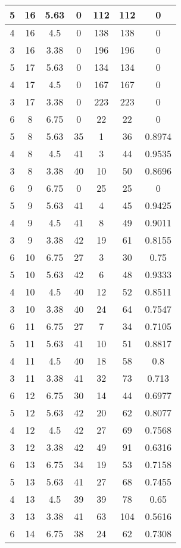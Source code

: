 \documentclass[letterpaper, 12pt]{article}
\begin{document}
\begin{longtable}{|c|c|c|c|c|c|c|}
\hline
5 & 16 & 5.63 & 0 & 112 & 112 & 0 \\
\hline
4 & 16 & 4.5 & 0 & 138 & 138 & 0 \\
\hline
3 & 16 & 3.38 & 0 & 196 & 196 & 0 \\
\hline
5 & 17 & 5.63 & 0 & 134 & 134 & 0 \\
\hline
4 & 17 & 4.5 & 0 & 167 & 167 & 0 \\
\hline
3 & 17 & 3.38 & 0 & 223 & 223 & 0 \\
\hline
6 & 8 & 6.75 & 0 & 22 & 22 & 0 \\
\hline
5 & 8 & 5.63 & 35 & 1 & 36 & 0.8974 \\
\hline
4 & 8 & 4.5 & 41 & 3 & 44 & 0.9535 \\
\hline
3 & 8 & 3.38 & 40 & 10 & 50 & 0.8696 \\
\hline
6 & 9 & 6.75 & 0 & 25 & 25 & 0 \\
\hline
5 & 9 & 5.63 & 41 & 4 & 45 & 0.9425 \\
\hline
4 & 9 & 4.5 & 41 & 8 & 49 & 0.9011 \\
\hline
3 & 9 & 3.38 & 42 & 19 & 61 & 0.8155 \\
\hline
6 & 10 & 6.75 & 27 & 3 & 30 & 0.75 \\
\hline
5 & 10 & 5.63 & 42 & 6 & 48 & 0.9333 \\
\hline
4 & 10 & 4.5 & 40 & 12 & 52 & 0.8511 \\
\hline
3 & 10 & 3.38 & 40 & 24 & 64 & 0.7547 \\
\hline
6 & 11 & 6.75 & 27 & 7 & 34 & 0.7105 \\
\hline
5 & 11 & 5.63 & 41 & 10 & 51 & 0.8817 \\
\hline
4 & 11 & 4.5 & 40 & 18 & 58 & 0.8 \\
\hline
3 & 11 & 3.38 & 41 & 32 & 73 & 0.713 \\
\hline
6 & 12 & 6.75 & 30 & 14 & 44 & 0.6977 \\
\hline
5 & 12 & 5.63 & 42 & 20 & 62 & 0.8077 \\
\hline
4 & 12 & 4.5 & 42 & 27 & 69 & 0.7568 \\
\hline
3 & 12 & 3.38 & 42 & 49 & 91 & 0.6316 \\
\hline
6 & 13 & 6.75 & 34 & 19 & 53 & 0.7158 \\
\hline
5 & 13 & 5.63 & 41 & 27 & 68 & 0.7455 \\
\hline
4 & 13 & 4.5 & 39 & 39 & 78 & 0.65 \\
\hline
3 & 13 & 3.38 & 41 & 63 & 104 & 0.5616 \\
\hline
6 & 14 & 6.75 & 38 & 24 & 62 & 0.7308 \\

\end{longtable}
\end{document}
